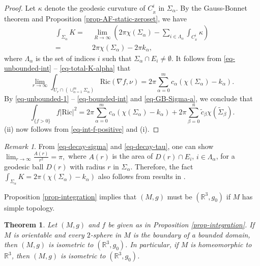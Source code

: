 \documentclass[12pt]{amsart}
\newtheorem{thm}{Theorem}[section]
\theoremstyle{remark}
\newtheorem{remark}{Remark}[section]
\numberwithin{equation}{section}
\newcommand{\Ric}{\mbox{Ric}}
\newcommand{\R}{\mathbb R}
\newcommand{\be}{\begin{equation}}
\newcommand{\ee}{\end{equation}}
\def\lf{\left}
\def\ri{\right}
\def\a{\alpha}
\begin{document}
\begin{proof}
 Let $\kappa$ denote the geodesic curvature of $C_{_R}^i$ in $\Sigma_\alpha$.
 By  the Gauss-Bonnet theorem and   Proposition \ref{prop-AF-static-zeroset},  we have
\be \label{eq-total-K-alpha}
\begin{split}
\int_{\Sigma_\a} K = & \ \lim_{R \rightarrow \infty}  \lf(  2\pi \chi (\Sigma_\a)  -  \sum_{i \in \Lambda_\a}   \int_{C^i_{_R} } \kappa  \ri) \\
= & \    2\pi \chi (\Sigma_\a)  - 2 \pi k_\alpha  ,
\end{split}
\ee
where  $ \Lambda_\a $ is the set of indices $i$ such that  $ \Sigma_\alpha \cap E_i \neq \emptyset $.
It follows from \eqref{eq-unbounded-int} -- \eqref{eq-total-K-alpha} that
\be \label{eq-GB-Sigma-a}
\lim_{ r \rightarrow \infty} \int_{ U_r \cap \lf(\cup_{\a=1}^m \Sigma_\a \ri) }
 \Ric (\nabla f, \nu )  =  2 \pi \sum_{\alpha = 0}^m c_\a   ( \chi (\Sigma_\a) - k_\a ) .
\ee
By \eqref{eq-unbounded-1} -- \eqref{eq-bounded-int} and \eqref{eq-GB-Sigma-a}, we conclude that
\be \label{eq-int-f-positive}
\int_{ \{ f > 0 \}  } f | \Ric|^2  = 2 \pi \sum_{\alpha = 0}^m c_\a   ( \chi (\Sigma_\a) - k_\a ) +  2 \pi \sum_{\beta = 0}^n  \tilde c_\beta \chi(\tilde \Sigma_\beta).
\ee
(ii) now follows from \eqref{eq-int-f-positive} and (i).
\end{proof}

\begin{remark}
From \eqref{eq-decay-sigma} and \eqref{eq-decay-tau}, one can  show
$ \lim_{r\to\infty}\frac{A(r)}{r^2}= \pi, $
where $A(r)$ is the area of $ D(r) \cap E_i$,  $i\in \Lambda_\a$, for  a geodesic ball $D(r)$  with radius $r$ in $\Sigma_\a$.
Therefore, the fact  $ \int_{\Sigma_\a} K = 2 \pi  ( \chi (\Sigma_\a) -  k_\a ) $ also follows from  results in
\cite{Hartman1964, Shiohama85}.
\end{remark}


Proposition \ref{prop-integration} implies  that $(M, g)$ must be $(\R^3, g_0)$ if  $M$  has simple topology.

\begin{thm} \label{thm-simple-top}
Let $(M,g)$ and $f$ be given as in Proposition \ref{prop-integration}.
If $M$ is orientable and   every  $2$-sphere  in $M$ is the boundary of a bounded domain,
 then $(M, g)$ is  isometric to $(\R^3, g_0)$.
 In particular, if  $M$ is homeomorphic to $\R^3$, then $(M, g)$ is isometric to $(\R^3, g_0)$.
\end{thm}
\end{document}
